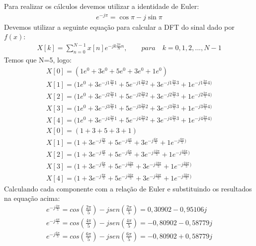 \documentclass[12pt]{article}
\begin{document}
\begin{itemize}
\begin{itemize}
Para realizar os cálculos devemos utilizar a identidade de Euler:
\begin{align*}
    e^{-j \pi} = \cos \pi - j\sin\pi
\end{align*}
Devemos utilizar a seguinte equação para calcular a DFT do sinal dado por $f(x)$:
\begin{align*}
    X[k] = \sum\limits_{n=0}^{N-1} x[n] e^{-jk\frac{2\pi}{N}n},\qquad para\quad k=0,1,2,...,N-1
\end{align*}
Temos que N=5, logo:
\begin{align*}
    &X[0] = (1e^0 + 3e^0 + 5e^0 + 3e^0 + 1e^0) &\\
    &X[1] = (1e^0 + 3e^{-j1\frac{2\pi}{5}1} + 5e^{-j1\frac{2\pi}{5}2} + 3e^{-j1\frac{2\pi}{5}3} + 1e^{-j1\frac{2\pi}{5}4)} &\\
    &X[2] = (1e^0 + 3e^{-j2\frac{2\pi}{5}1} + 5e^{-j2\frac{2\pi}{5}2} + 3e^{-j2\frac{2\pi}{5}3} + 1e^{-j2\frac{2\pi}{5}4)} &\\
    &X[3] = (1e^0 + 3e^{-j3\frac{2\pi}{5}1} + 5e^{-j3\frac{2\pi}{5}2} + 3e^{-j3\frac{2\pi}{5}3} + 1e^{-j3\frac{2\pi}{5}4)} &\\
    &X[4] = (1e^0 + 3e^{-j4\frac{2\pi}{5}1} + 5e^{-j4\frac{2\pi}{5}2} + 3e^{-j4\frac{2\pi}{5}3} + 1e^{-j4\frac{2\pi}{5}4)} &\\
    &X[0] = (1 + 3 + 5 + 3 + 1) &\\
    &X[1] = (1 + 3e^{-j\frac{2\pi}{5}} + 5e^{-j\frac{4\pi}{5}}  + 3e^{-j\frac{6\pi}{5}}  + 1e^{-j\frac{8\pi}{5})} &\\
    &X[2] = (1 + 3e^{-j\frac{4\pi}{5}} + 5e^{-j\frac{6\pi}{5}}  + 3e^{-j\frac{12\pi}{5}} + 1e^{-j\frac{16\pi}{5})} &\\
    &X[3] = (1 + 3e^{-j\frac{6\pi}{5}} + 5e^{-j\frac{12\pi}{5}} + 3e^{-j\frac{18\pi}{5}} + 1e^{-j\frac{24\pi}{5})} &\\
    &X[4] = (1 + 3e^{-j\frac{8\pi}{5}} + 5e^{-j\frac{16\pi}{5}} + 3e^{-j\frac{24\pi}{5}} + 1e^{-j\frac{32\pi}{5})}&
\end{align*}
Calculando cada componente com a relação de Euler e substituindo os resultados na equação acima:
\begin{align*}
    &e^{-j\frac{2\pi}{5}} = cos(\frac{2\pi}{5}) - jsen(\frac{2\pi}{5}) = 0,30902  - 0,95106j &\\
    &e^{-j\frac{4\pi}{5}} = cos(\frac{4\pi}{5}) - jsen(\frac{4\pi}{5}) = -0,80902 - 0,58779j &\\
    &e^{-j\frac{6\pi}{5}} = cos(\frac{6\pi}{5}) - jsen(\frac{6\pi}{5}) = -0,80902 + 0,58779j &\\

\end{align*}
\end{itemize}
\end{itemize}
\end{document}
